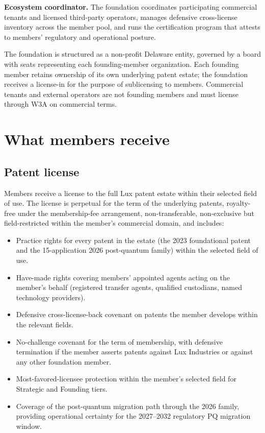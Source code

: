 \documentclass[11pt,letterpaper]{article}
\begin{document}
\textbf{Ecosystem coordinator.} The foundation coordinates participating commercial tenants and licensed third-party operators, manages defensive cross-license inventory across the member pool, and runs the certification program that attests to members' regulatory and operational posture.

The foundation is structured as a non-profit Delaware entity, governed by a board with seats representing each founding-member organization. Each founding member retains ownership of its own underlying patent estate; the foundation receives a license-in for the purpose of sublicensing to members. Commercial tenants and external operators are not founding members and must license through W3A on commercial terms.

\section{What members receive}

\subsection{Patent license}

Members receive a license to the full Lux patent estate within their selected field of use. The license is perpetual for the term of the underlying patents, royalty-free under the membership-fee arrangement, non-transferable, non-exclusive but field-restricted within the member's commercial domain, and includes:

\begin{itemize}
\item Practice rights for every patent in the estate (the 2023 foundational patent and the 15-application 2026 post-quantum family) within the selected field of use.
\item Have-made rights covering members' appointed agents acting on the member's behalf (registered transfer agents, qualified custodians, named technology providers).
\item Defensive cross-license-back covenant on patents the member develops within the relevant fields.
\item No-challenge covenant for the term of membership, with defensive termination if the member asserts patents against Lux Industries or against any other foundation member.
\item Most-favored-licensee protection within the member's selected field for Strategic and Founding tiers.
\item Coverage of the post-quantum migration path through the 2026 family, providing operational certainty for the 2027--2032 regulatory PQ migration window.
\end{itemize}
\end{document}
